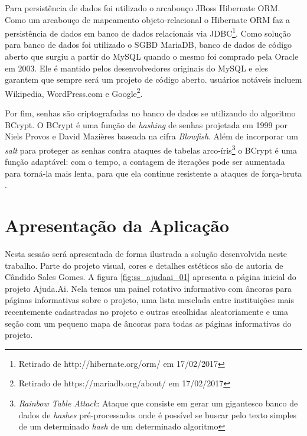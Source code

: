 Para persistência de dados foi utilizado o arcabouço JBoss Hibernate ORM. Como um arcabouço de mapeamento objeto-relacional o Hibernate ORM faz a persistência de dados em banco de dados relacionais via JDBC\footnote{Retirado de http://hibernate.org/orm/ em 17/02/2017}. Como solução para banco de dados foi utilizado o SGBD MariaDB, banco de dados de código aberto que surgiu a partir do MySQL quando o mesmo foi comprado pela Oracle em 2003. Ele é mantido pelos desenvolvedores originais do MySQL e eles garantem que sempre será um projeto de código aberto. usuários notáveis incluem Wikipedia, WordPress.com e Google\footnote{Retirado de https://mariadb.org/about/ em 17/02/2017}.

Por fim, senhas são criptografadas no banco de dados se utilizando do algoritmo BCrypt. O BCrypt é uma função de \emph{hashing} de senhas projetada em 1999 por Niels Provos e David Mazières baseada na cifra \emph{Blowfish}. Além de incorporar um \emph{salt} para proteger as senhas contra ataques de tabelas arco-íris\footnote{\emph{Rainbow Table Attack}: Ataque que consiste em gerar um gigantesco banco de dados de \emph{hashes} pré-processados onde é possível se buscar pelo texto simples de um determinado \emph{hash} de um determinado algoritmo} o BCrypt é uma função adaptável: com o tempo, a contagem de iterações pode ser aumentada para torná-la mais lenta, para que ela continue resistente a ataques de força-bruta \cite{wiki:Bcrypt}.





\section{Apresentação da Aplicação} \label{sec:ajudaai:apresentacao}

Nesta sessão será apresentada de forma ilustrada a solução desenvolvida neste trabalho. Parte do projeto visual, cores e detalhes estéticos são de autoria de Cândido Sales Gomes. A figura \ref{fig:ss_ajudaai_01} apresenta a página inicial do projeto Ajuda.Ai. Nela temos um painel rotativo informativo com âncoras para páginas informativas sobre o projeto, uma lista mesclada entre instituições mais recentemente cadastradas no projeto e outras escolhidas aleatoriamente e uma seção com um pequeno mapa de âncoras para todas as páginas informativas do projeto.

